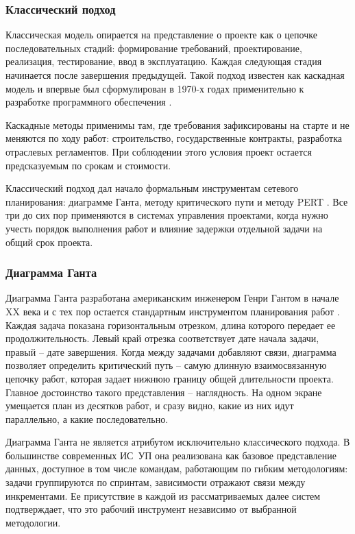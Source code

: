 \subsubsection{Классический подход}

Классическая модель опирается на представление о проекте как о цепочке последовательных стадий: формирование требований, проектирование, реализация, тестирование, ввод в эксплуатацию. Каждая следующая стадия начинается после завершения предыдущей. Такой подход известен как каскадная модель и впервые был сформулирован в 1970-х годах применительно к разработке программного обеспечения \cite{mazur2014}.

Каскадные методы применимы там, где требования зафиксированы на старте и не меняются по ходу работ: строительство, государственные контракты, разработка отраслевых регламентов. При соблюдении этого условия проект остается предсказуемым по срокам и стоимости.

Классический подход дал начало формальным инструментам сетевого планирования: диаграмме Ганта, методу критического пути и методу PERT \cite{pmbok6}. Все три до сих пор применяются в системах управления проектами, когда нужно учесть порядок выполнения работ и влияние задержки отдельной задачи на общий срок проекта.

\subsubsection{Диаграмма Ганта}

Диаграмма Ганта разработана американским инженером Генри Гантом в начале XX века и с тех пор остается стандартным инструментом планирования работ \cite{art_gantt}. Каждая задача показана горизонтальным отрезком, длина которого передает ее продолжительность. Левый край отрезка соответствует дате начала задачи, правый -- дате завершения. Когда между задачами добавляют связи, диаграмма позволяет определить критический путь -- самую длинную взаимосвязанную цепочку работ, которая задает нижнюю границу общей длительности проекта. Главное достоинство такого представления -- наглядность. На одном экране умещается план из десятков работ, и сразу видно, какие из них идут параллельно, а какие последовательно.

Диаграмма Ганта не является атрибутом исключительно классического подхода. В большинстве современных ИС~УП она реализована как базовое представление данных, доступное в том числе командам, работающим по гибким методологиям: задачи группируются по спринтам, зависимости отражают связи между инкрементами. Ее присутствие в каждой из рассматриваемых далее систем подтверждает, что это рабочий инструмент независимо от выбранной методологии.

